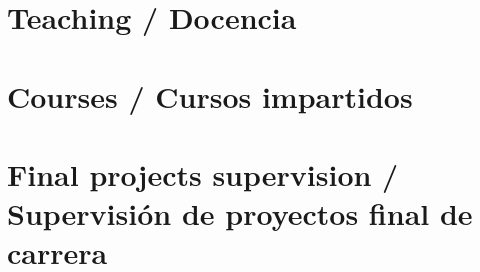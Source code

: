 \documentclass{article}
\begin{document}
\section{Teaching / Docencia}


\renewcommand{\refname}{}
\section{Courses / Cursos impartidos}


\renewcommand{\refname}{}
\section{Final projects supervision / Supervisión de proyectos final de carrera}

\end{document}
